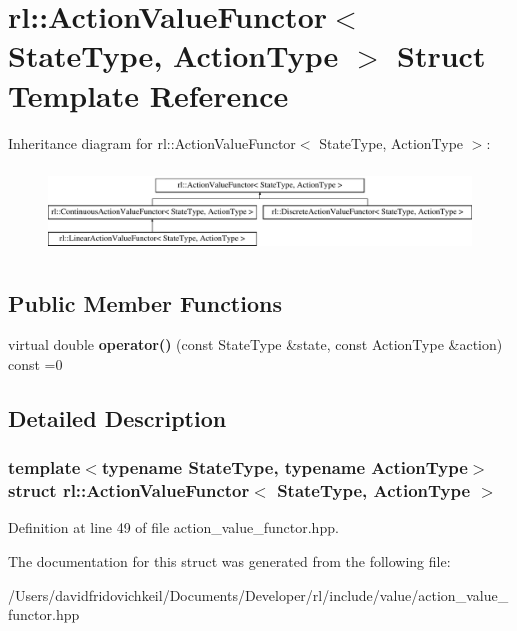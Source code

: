 \hypertarget{structrl_1_1_action_value_functor}{}\section{rl\+:\+:Action\+Value\+Functor$<$ State\+Type, Action\+Type $>$ Struct Template Reference}
\label{structrl_1_1_action_value_functor}
Inheritance diagram for rl\+:\+:Action\+Value\+Functor$<$ State\+Type, Action\+Type $>$\+:\begin{figure}[H]
\begin{center}
\leavevmode
\includegraphics[height=2.314050cm]{structrl_1_1_action_value_functor}
\end{center}
\end{figure}
\subsection*{Public Member Functions}
\begin{DoxyCompactItemize}
\item 
\hypertarget{structrl_1_1_action_value_functor_af9cfc8284c860973783ddd4204b056b8}{}\label{structrl_1_1_action_value_functor_af9cfc8284c860973783ddd4204b056b8} 
virtual double {\bfseries operator()} (const State\+Type \&state, const Action\+Type \&action) const =0
\end{DoxyCompactItemize}


\subsection{Detailed Description}
\subsubsection*{template$<$typename State\+Type, typename Action\+Type$>$\newline
struct rl\+::\+Action\+Value\+Functor$<$ State\+Type, Action\+Type $>$}



Definition at line 49 of file action\+\_\+value\+\_\+functor.\+hpp.



The documentation for this struct was generated from the following file\+:\begin{DoxyCompactItemize}
\item 
/\+Users/davidfridovichkeil/\+Documents/\+Developer/rl/include/value/action\+\_\+value\+\_\+functor.\+hpp\end{DoxyCompactItemize}
